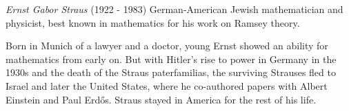 \documentclass[12pt]{article}
\begin{document}
\emph{Ernst Gabor Straus} (1922 - 1983) German-American Jewish mathematician and physicist, best known in mathematics for his work on Ramsey theory.

Born in Munich of a lawyer and a doctor, young Ernst showed an ability for mathematics from early on. But with Hitler's rise to power in Germany in the 1930s and the death of the Straus paterfamilias, the surviving Strauses fled to Israel and later the United States, where he co-authored papers with Albert Einstein and Paul Erd\H{o}s. Straus stayed in America for the rest of his life.

\end{document}
